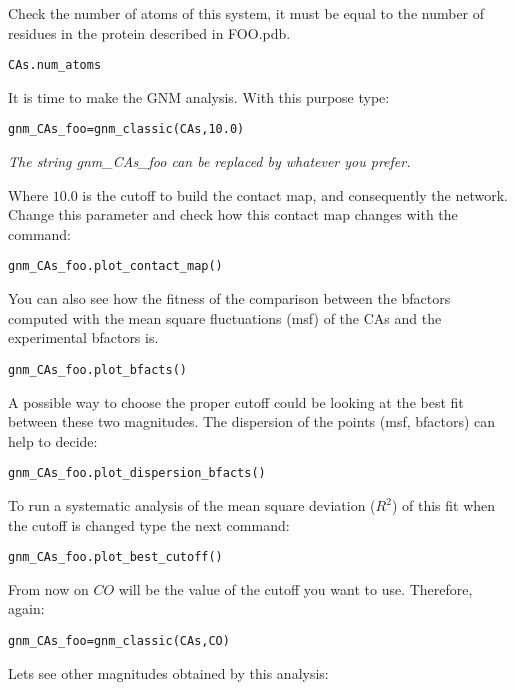 \documentclass[12pt]{article}
\begin{document}
Check the number of atoms of this system, it must be equal to the
number of residues in the protein described in FOO.pdb.

\begin{verbatim}
CAs.num_atoms
\end{verbatim}

It is time to make the GNM analysis. With this purpose type:

\begin{verbatim}
gnm_CAs_foo=gnm_classic(CAs,10.0)
\end{verbatim}

\emph{The string gnm\_CAs\_foo can be replaced by whatever you prefer.}

Where $10.0$ is the cutoff to build the contact map, and consequently the network.
Change this parameter and check how this contact map changes with the command:

\begin{verbatim}
gnm_CAs_foo.plot_contact_map()
\end{verbatim}

You can also see how the fitness of the comparison between the
bfactors computed with the mean square fluctuations (msf) of the CAs
and the experimental bfactors is.

\begin{verbatim}
gnm_CAs_foo.plot_bfacts()
\end{verbatim}

A possible way to choose the proper cutoff could be looking at the
best fit between these two magnitudes. The dispersion of the points
(msf, bfactors) can help to decide:

\begin{verbatim}
gnm_CAs_foo.plot_dispersion_bfacts()
\end{verbatim}

To run a systematic analysis of the mean square deviation ($R^{2}$) of
this fit when the cutoff is changed type the next command:
\begin{verbatim}
gnm_CAs_foo.plot_best_cutoff()
\end{verbatim}

From now on $CO$ will be the value of the cutoff you want to
use. Therefore, again:

\begin{verbatim}
gnm_CAs_foo=gnm_classic(CAs,CO)
\end{verbatim}

Lets see other magnitudes obtained by this analysis:
\end{document}
